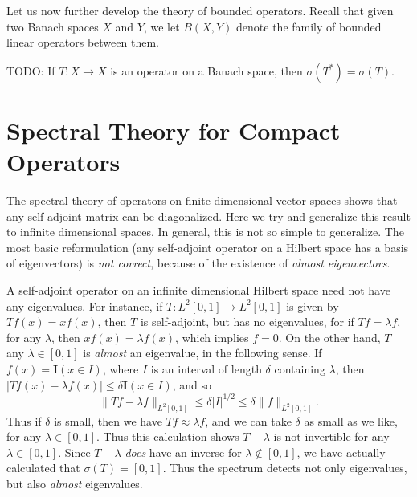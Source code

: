 Let us now further develop the theory of bounded operators. Recall that given two Banach spaces $X$ and $Y$, we let $B(X,Y)$ denote the family of bounded linear operators between them.

TODO: If $T: X \to X$ is an operator on a Banach space, then $\sigma(T^*) = \sigma(T)$.







\section{Spectral Theory for Compact Operators}

The spectral theory of operators on finite dimensional vector spaces shows that any self-adjoint matrix can be diagonalized. Here we try and generalize this result to infinite dimensional spaces. In general, this is not so simple to generalize. The most basic reformulation (any self-adjoint operator on a Hilbert space has a basis of eigenvectors) is \emph{not correct}, because of the existence of \emph{almost eigenvectors}.

\begin{example}
    A self-adjoint operator on an infinite dimensional Hilbert space need not have any eigenvalues. For instance, if $T: L^2[0,1] \to L^2[0,1]$ is given by $Tf(x) = x f(x)$, then $T$ is self-adjoint, but has no eigenvalues, for if $Tf = \lambda f$, for any $\lambda$, then $x f(x) = \lambda f(x)$, which implies $f = 0$. On the other hand, $T$ any $\lambda \in [0,1]$ is \emph{almost} an eigenvalue, in the following sense. If $f(x) = \mathbf{I}(x \in I)$, where $I$ is an interval of length $\delta$ containing $\lambda$, then $|Tf(x) - \lambda f(x)| \leq \delta \mathbf{I}(x \in I)$, and so
    \[ \| Tf - \lambda f \|_{L^2[0,1]} \leq \delta |I|^{1/2} \leq \delta \| f \|_{L^2[0,1]}. \]
    Thus if $\delta$ is small, then we have $Tf \approx \lambda f$, and we can take $\delta$ as small as we like, for any $\lambda \in [0,1]$. Thus this calculation shows $T - \lambda$ is not invertible for any $\lambda \in [0,1]$. Since $T - \lambda$ \emph{does} have an inverse for $\lambda \not \in [0,1]$, we have actually calculated that $\sigma(T) = [0,1]$. Thus the spectrum detects not only eigenvalues, but also \emph{almost} eigenvalues.
\end{example}

